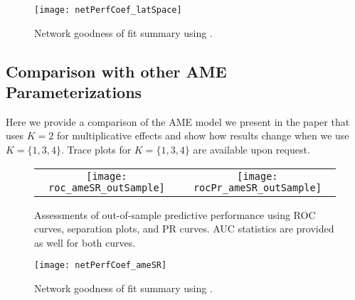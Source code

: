\begin{figure}[ht]
	\centering
	\texttt{[image: netPerfCoef\_latSpace]}
	\caption{Network goodness of fit summary using .}
	\label{fig:netPerfCoef_latSpace}
\end{figure}

\FloatBarrier

\clearpage
\subsection{Comparison with other AME Parameterizations}
\label{sec:ameVsAmeAppendix}

Here we provide a comparison of the AME model we present in the paper that uses $K=2$ for multiplicative effects and show how results change when we use $K=\{1,3,4\}$. Trace plots for $K=\{1,3,4\}$ are available upon request.



\begin{figure}[ht]
	\centering
	\begin{tabular}{cc}
	\texttt{[image: roc\_ameSR\_outSample]} & 
	\texttt{[image: rocPr\_ameSR\_outSample]}
	\end{tabular}
	\caption{Assessments of out-of-sample predictive performance using ROC curves, separation plots, and PR curves. AUC statistics are provided as well for both curves.}
	\label{fig:roc_ame}
\end{figure}

\begin{figure}[ht]
	\centering
	\texttt{[image: netPerfCoef\_ameSR]}
	\caption{Network goodness of fit summary using .}
	\label{fig:netPerfCoef_ameSR}
\end{figure}

\FloatBarrier


